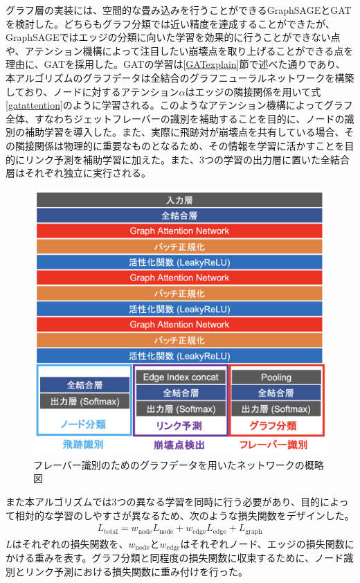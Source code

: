 グラフ層の実装には、空間的な畳み込みを行うことができるGraphSAGEとGATを検討した。どちらもグラフ分類では近い精度を達成することができたが、GraphSAGEではエッジの分類に向いた学習を効果的に行うことができない点や、アテンション機構によって注目したい崩壊点を取り上げることができる点を理由に、GATを採用した。GATの学習は\ref{GATexplain}節で述べた通りであり、本アルゴリズムのグラフデータは全結合のグラフニューラルネットワークを構築しており、ノードに対するアテンション$\alpha$はエッジの隣接関係を用いて式\ref{gatattention}のように学習される。このようなアテンション機構によってグラフ全体、すなわちジェットフレーバーの識別を補助することを目的に、ノードの識別の補助学習を導入した。また、実際に飛跡対が崩壊点を共有している場合、その隣接関係は物理的に重要なものとなるため、その情報を学習に活かすことを目的にリンク予測を補助学習に加えた。また、3つの学習の出力層に置いた全結合層はそれぞれ独立に実行される。

\begin{figure}[H]
	\begin{center}
 \includegraphics[keepaspectratio, scale=0.38]
 	{Figure/Flavortagging/gnn.png}
 		\caption{フレーバー識別のためのグラフデータを用いたネットワークの概略図}
 		\label{gnnmodel}
	\end{center}
\end{figure}
また本アルゴリズムでは3つの異なる学習を同時に行う必要があり、目的によって相対的な学習のしやすさが異なるため、次のような損失関数をデザインした。\\
\begin{align}
L_{\mathrm{total}} = w_{\mathrm{node}} L_{\mathrm{node}} + w_{\mathrm{edge}} L_{\mathrm{edge}} +  L_{\mathrm{graph}}
\end{align}
$L$はそれぞれの損失関数を、$w_\mathrm{{node}}とw_\mathrm{{edge}}$はそれぞれノード、エッジの損失関数にかける重みを表す。グラフ分類と同程度の損失関数に収束するために、ノード識別とリンク予測における損失関数に重み付けを行った。

